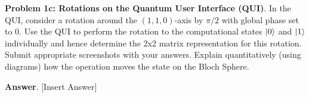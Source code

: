 \textbf{Problem 1c: Rotations on the Quantum User Interface (QUI)}. In the QUI, consider a rotation around the $(1,1,0)$-axis by $\pi/2$ with global phase set to $0$. 
Use the QUI to perform the rotation to the computational states $\ket{0}$ and $\ket{1}$ individually and hence determine the 2x2 matrix representation for this rotation. 
Submit appropriate screenshots with your answers. 
Explain quantitatively (using diagrams) how the operation moves the state on the Bloch Sphere.


\textbf{Answer}. [Insert Answer]


